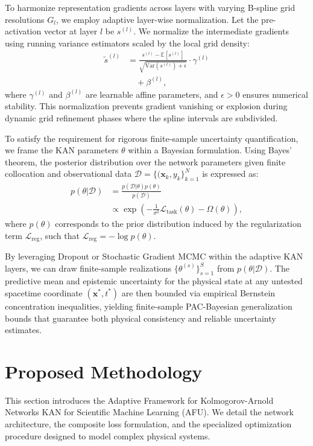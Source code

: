 \documentclass[10pt,twocolumn]{article}
\begin{document}
To harmonize representation gradients across layers with varying B-spline grid resolutions $G_l$, we employ adaptive layer-wise normalization. Let the pre-activation vector at layer $l$ be $s^{(l)}$. We normalize the intermediate gradients using running variance estimators scaled by the local grid density:
\begin{equation}
\begin{aligned}
\tilde{s}^{(l)} &= \frac{s^{(l)} - \mathbb{E}[s^{(l)}]}{\sqrt{\text{Var}(s^{(l)}) + \epsilon}} \cdot \gamma^{(l)} \\
&\quad + \beta^{(l)},
\end{aligned}
\end{equation}
where $\gamma^{(l)}$ and $\beta^{(l)}$ are learnable affine parameters, and $\epsilon > 0$ ensures numerical stability. This normalization prevents gradient vanishing or explosion during dynamic grid refinement phases where the spline intervals are subdivided.

To satisfy the requirement for rigorous finite-sample uncertainty quantification, we frame the KAN parameters $\theta$ within a Bayesian formulation. Using Bayes' theorem, the posterior distribution over the network parameters given finite collocation and observational data $\mathcal{D} = \{(\mathbf{x}_k, y_k\}_{k=1}^N$ is expressed as:
\begin{equation}
\begin{aligned}
p(\theta | \mathcal{D}) &= \frac{p(\mathcal{D} | \theta) p(\theta)}{p(\mathcal{D})} \\
&\propto \exp\left( -\frac{1}{\sigma^2} \mathcal{L}_{\text{task}}(\theta) - \Omega(\theta) \right),
\end{aligned}
\end{equation}
where $p(\theta)$ corresponds to the prior distribution induced by the regularization term $\mathcal{L}_{\text{reg}}$, such that $\mathcal{L}_{\text{reg}} = -\log p(\theta)$. 

By leveraging Dropout or Stochastic Gradient MCMC within the adaptive KAN layers, we can draw finite-sample realizations $\{\theta^{(s)}\}_{s=1}^S$ from $p(\theta | \mathcal{D})$. The predictive mean and epistemic uncertainty for the physical state at any untested spacetime coordinate $(\mathbf{x}^*, t^*)$ are then bounded via empirical Bernstein concentration inequalities, yielding finite-sample PAC-Bayesian generalization bounds that guarantee both physical consistency and reliable uncertainty estimates.

\section{Proposed Methodology}
This section introduces the Adaptive Framework for Kolmogorov-Arnold Networks KAN for Scientific Machine Learning (AFU). 
We detail the network architecture, the composite loss formulation, and the specialized optimization procedure designed to model complex physical systems.
\end{document}
